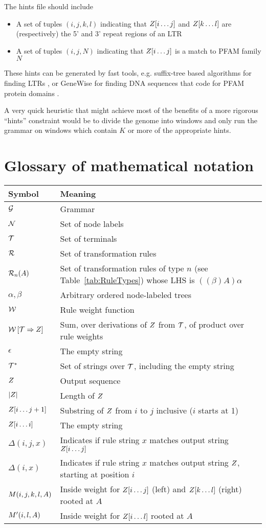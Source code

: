 \documentclass[10pt]{article}
\newcommand{\tabnum}[1]{\ref{tab:#1}}
\newcommand{\tabref}[1]{Table~\tabnum{#1}}
\begin{document}
The hints file should include
\begin{itemize}
\item A set of tuples $(i,j,k,l)$ indicating that $Z[i \ldots j]$ and $Z[k \ldots l]$ are (respectively) the 5' and 3' repeat regions of an LTR
\item A set of tuples $(i,j,N)$ indicating that $Z[i \ldots j]$ is a match to PFAM family $N$
\end{itemize}

These hints can be generated by fast tools, e.g. suffix-tree based algorithms for finding LTRs \cite{pmid16819780},
or GeneWise for finding DNA sequences that code for PFAM protein domains \cite{BirneyEtAl04}.

A very quick heuristic that might achieve most of the benefits of a more rigorous ``hints'' constraint
would be to divide the genome into windows and only run the grammar on windows which contain $K$ or more of the appropriate hints.

\section{Glossary of mathematical notation}

\noindent
\begin{tabular}{ll}
Symbol & Meaning \\
\hline
${\cal G}$ & Grammar \\
${\cal N}$ & Set of node labels \\
${\cal T}$ & Set of terminals \\
${\cal R}$ & Set of transformation rules \\
${\cal R}_{n}(A)$ & Set of transformation rules of type $n$ (see \tabref{RuleTypes}) whose LHS is $((\beta)A)\alpha$ \\
$\alpha,\beta$ & Arbitrary ordered node-labeled trees \\
${\cal W}$ & Rule weight function \\
${\cal W} \left[ {\cal T} \Rightarrow {Z} \right]$ & Sum, over derivations of $Z$ from ${\cal T}$, of product over rule weights \\
$\epsilon$ & The empty string \\
${\cal T}^\ast$ & Set of strings over ${\cal T}$, including the empty string \\
$Z$ & Output sequence \\
$|Z|$ & Length of $Z$ \\
$Z[i \ldots j+1]$ & Substring of $Z$ from $i$ to $j$ inclusive ($i$ starts at 1) \\
$Z[i \ldots i]$ & The empty string \\
$\Delta(i,j,x)$ & Indicates if rule string $x$ matches output string $Z[i \ldots j]$ \\
$\Delta(i,x)$ & Indicates if rule string $x$ matches output string $Z$, starting at position $i$ \\
$M(i,j,k,l,A)$ & Inside weight for $Z[i \ldots j]$ (left) and $Z[k \ldots l]$ (right) rooted at $A$ \\
$M'(i,l,A)$ & Inside weight for $Z[i \ldots l]$ rooted at $A$ \\
\end{tabular}
\end{document}
